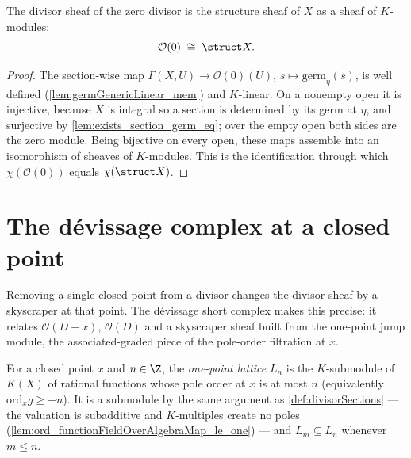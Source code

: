 \begin{theorem}
  \label{thm:divisorSheafZeroIso}
  \leanok
  The divisor sheaf of the zero divisor is the structure sheaf of \(X\) as a sheaf of \(K\)-modules:
  \[
    \mathcal O(0) \;\cong\; \struct X .
  \]
\end{theorem}
\begin{proof}
  \leanok
  The section-wise map \(\Gamma(X, U) \to \mathcal O(0)(U)\), \(s \mapsto \mathrm{germ}_\eta(s)\), is
  well defined (\ref{lem:germGenericLinear_mem}) and \(K\)-linear. On a nonempty open it is
  injective, because \(X\) is integral so a section is determined by its germ at \(\eta\), and
  surjective by \ref{lem:exists_section_germ_eq}; over the empty open both sides are the zero module.
  Being bijective on every open, these maps assemble into an isomorphism of sheaves of \(K\)-modules.
  This is the identification through which \(\chi(\mathcal O(0))\) equals \(\chi(\struct X)\).
\end{proof}

\section{The dévissage complex at a closed point}

Removing a single closed point from a divisor changes the divisor sheaf by a skyscraper at that
point. The dévissage short complex makes this precise: it relates \(\mathcal O(D-x)\), \(\mathcal
O(D)\) and a skyscraper sheaf built from the one-point jump module, the associated-graded piece of
the pole-order filtration at \(x\).

\begin{definition}
  \label{def:pointLattice}
  \leanok
  For a closed point \(x\) and \(n \in \Z\), the \emph{one-point lattice} \(L_n\) is the
  \(K\)-submodule of \(K(X)\) of rational functions whose pole order at \(x\) is at most \(n\)
  (equivalently \(\mathrm{ord}_x g \ge -n\)). It is a submodule by the same argument as
  \ref{def:divisorSections} --- the valuation is subadditive and \(K\)-multiples create no poles
  (\ref{lem:ord_functionFieldOverAlgebraMap_le_one}) --- and \(L_m \subseteq L_n\) whenever
  \(m \le n\).
\end{definition}

